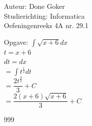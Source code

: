 \documentclass[a4paper]{article}
\begin{document}
  
\noindent \large Auteur: Done Goker \\
\noindent \large Studierichting: Informatica\\
\noindent \large Oefeningenreeks 4A nr. 29.1\\

\medskip

\normalsize

Opgave: 
$\displaystyle\int \sqrt{x+6} dx$ \\

$t = x+6$\\

$dt = dx$ \\

$=\displaystyle\int t^{\tfrac{1}{2}}dt$ \\

$ = \dfrac{2t^{\tfrac{3}{2}}}{3} + C$ \\

$= \dfrac{2(x+6)\sqrt{x+6}}{3} + C$


\begin{thebibliography}{999}
\end{thebibliography}
\end{document}
